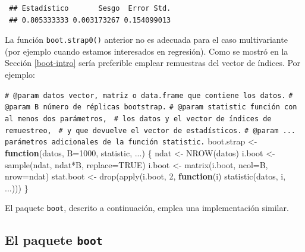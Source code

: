 \documentclass[
]{book}
\newenvironment{Shaded}{\begin{snugshade}}{\end{snugshade}}
\newcommand{\AttributeTok}[1]{\textcolor[rgb]{0.77,0.63,0.00}{#1}}
\newcommand{\CommentTok}[1]{\textcolor[rgb]{0.56,0.35,0.01}{\textit{#1}}}
\newcommand{\ConstantTok}[1]{\textcolor[rgb]{0.00,0.00,0.00}{#1}}
\newcommand{\ControlFlowTok}[1]{\textcolor[rgb]{0.13,0.29,0.53}{\textbf{#1}}}
\newcommand{\DecValTok}[1]{\textcolor[rgb]{0.00,0.00,0.81}{#1}}
\newcommand{\FunctionTok}[1]{\textcolor[rgb]{0.00,0.00,0.00}{#1}}
\newcommand{\NormalTok}[1]{#1}
\newcommand{\OtherTok}[1]{\textcolor[rgb]{0.56,0.35,0.01}{#1}}
\newcommand{\SpecialCharTok}[1]{\textcolor[rgb]{0.00,0.00,0.00}{#1}}
\theoremstyle{break}
\theoremstyle{nonumberplain}
\renewcommand{\CommentTok}[1]{\textcolor[rgb]{0.41,0.41,0.41}{\texttt{#1}}}
\begin{document}
\begin{verbatim}
 ## Estadístico       Sesgo  Error Std. 
 ## 0.805333333 0.003173267 0.154099013
\end{verbatim}

La función \texttt{boot.strap0()} anterior no es adecuada para el caso multivariante
(por ejemplo cuando estamos interesados en regresión).
Como se mostró en la Sección \ref{boot-intro}
sería preferible emplear remuestras del vector de índices. Por ejemplo:

\begin{Shaded}
\begin{Highlighting}[]
\CommentTok{\#\textquotesingle{} @param datos vector, matriz o data.frame que contiene los datos.}
\CommentTok{\#\textquotesingle{} @param B número de réplicas bootstrap.}
\CommentTok{\#\textquotesingle{} @param statistic función con al menos dos parámetros, }
\CommentTok{\#\textquotesingle{} los datos y el vector de índices de remuestreo, }
\CommentTok{\#\textquotesingle{} y que devuelve el vector de estadísticos.}
\CommentTok{\#\textquotesingle{} @param ... parámetros adicionales de la función statistic.}
\NormalTok{boot.strap }\OtherTok{\textless{}{-}} \ControlFlowTok{function}\NormalTok{(datos, }\AttributeTok{B=}\DecValTok{1000}\NormalTok{, statistic, ...) \{}
\NormalTok{  ndat }\OtherTok{\textless{}{-}} \FunctionTok{NROW}\NormalTok{(datos)}
\NormalTok{  i.boot }\OtherTok{\textless{}{-}} \FunctionTok{sample}\NormalTok{(ndat, ndat}\SpecialCharTok{*}\NormalTok{B, }\AttributeTok{replace=}\ConstantTok{TRUE}\NormalTok{)}
\NormalTok{  i.boot }\OtherTok{\textless{}{-}} \FunctionTok{matrix}\NormalTok{(i.boot, }\AttributeTok{ncol=}\NormalTok{B, }\AttributeTok{nrow=}\NormalTok{ndat)}
\NormalTok{  stat.boot }\OtherTok{\textless{}{-}} \FunctionTok{drop}\NormalTok{(}\FunctionTok{apply}\NormalTok{(i.boot, }\DecValTok{2}\NormalTok{, }\ControlFlowTok{function}\NormalTok{(i) }\FunctionTok{statistic}\NormalTok{(datos, i, ...)))}
\NormalTok{\}}
\end{Highlighting}
\end{Shaded}

El paquete \texttt{boot}, descrito a continuación, emplea una implementación similar.

\hypertarget{intro-pkgboot}{%
\subsection{\texorpdfstring{El paquete \texttt{boot}}{El paquete boot}}\label{intro-pkgboot}}
\end{document}
